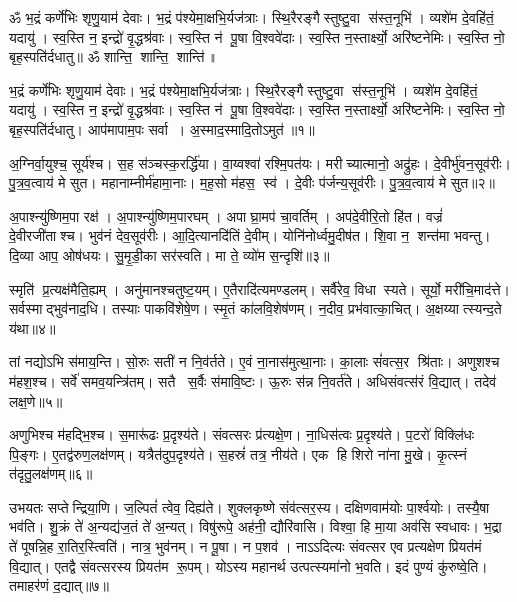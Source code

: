 \setcounter{anuvakam}{0}
ॐ भ॒द्रं कर्णे॑भिः शृणु॒याम॑ देवाः। भ॒द्रं प॑श्येमा॒क्षभि॒र्यज॑त्राः। 
स्थि॒रैरङ्गैस्तुष्टु॒वा स॑स्त॒नूभि॑। व्यशे॑म दे॒वहि॑तं॒ यदायु॑। 
स्व॒स्ति न॒ इन्द्रो॑ वृ॒द्धश्र॑वाः। स्व॒स्ति न॑ पू॒षा वि॒श्ववे॑दाः। 
स्व॒स्ति न॒स्तार्क्ष्यो॒ अरि॑ष्टनेमिः। स्व॒स्ति नो॒ बृह॒स्पति॑र्दधातु॥
ॐ शान्ति॒ शान्ति॒ शान्ति॑॥

भ॒द्रं कर्णे॑भिः शृणु॒याम॑ देवाः। भ॒द्रं प॑श्येमा॒क्षभि॒र्यज॑त्राः। 
स्थि॒रैरङ्गैस्तुष्टु॒वा स॑स्त॒नूभि॑। व्यशे॑म दे॒वहि॑तं॒ यदायु॑। 
स्व॒स्ति न॒ इन्द्रो॑ वृ॒द्धश्र॑वाः। स्व॒स्ति न॑ पू॒षा वि॒श्ववे॑दाः। 
स्व॒स्ति न॒स्तार्क्ष्यो॒ अरि॑ष्टनेमिः। स्व॒स्ति नो॒ बृह॒स्पति॑र्दधातु। 
आप॑मापाम॒पः सर्वा। अ॒स्माद॒स्मादि॒तोऽमुत॑॥१॥ 

अ॒ग्निर्वा॒युश्च॒ सूर्य॑श्च। स॒ह स॑ञ्चस्क॒रर्द्धि॑या। 
वा॒य्वश्वा॑ रश्मि॒पत॑यः। मरीच्यात्मानो॒ अद्रु॑हः। 
दे॒वीर्भु॑वन॒सूव॑रीः। पु॒त्र॒व॒त्वाय॑ मे सुत। 
महानाम्नीर्म॑हामा॒नाः। म॒ह॒सो म॑हस॒ स्व॑। 
दे॒वीः प॑र्जन्य॒सूव॑रीः। पु॒त्र॒व॒त्वाय॑ मे सुत॥२॥

अ॒पाश्न्यु॑ष्णिम॒पा रक्ष॑। अ॒पाश्न्यु॑ष्णिम॒पारघम्। 
अपाघ्रा॒मप॑ चा॒वर्तिम्। अप॑दे॒वीरि॒तो हि॑त। 
वज्रं॑ दे॒वीरजी॑ताश्च। भुव॑नं देव॒सूव॑रीः। 
आ॒दि॒त्यानदि॑तिं दे॒वीम्। योनि॑नोर्ध्वमु॒दीष॑त। 
शि॒वा न॒ शन्त॑मा भवन्तु। दि॒व्या आप॒ ओष॑धयः। 
सु॒मृ॒डी॒का सर॑स्वति। मा ते॒ व्यो॑म स॒न्दृशि॑॥३॥\anuvakamend


स्मृति॑ प्र॒त्यक्ष॑मैति॒ह्यम्। अनु॑मानश्चतुष्ट॒यम्‌। 
ए॒तैरादि॑त्य\-मण्डलम्‌। सर्वै॑रेव॒ विधास्यते। 
सूर्यो॒ मरी॑चि॒माद॑त्ते। सर्वस्माद्भुव॑नाद॒धि। 
तस्याः पाकवि॑शेषे॒ण। स्मृ॒तं का॑लवि॒शेष॑णम्‌। 
न॒दीव॒ प्रभ॑वात्का॒चित्‌। अ॒क्षय्यात्स्यन्द॒ते य॑था॥४॥

तां नद्योऽभि स॑माय॒न्ति। सो॒रुः सती॑ न नि॒व॑र्तते। 
ए॒वं ना॒नास॑मुत्था॒नाः। का॒लाः सं॑वत्स॒र श्रि॑ताः। 
 अणुशश्च म॑हश॒श्च। सर्वे॑ समव॒यन्त्रि॑तम्‌। 
सतै स॒र्वैः स॑मावि॒ष्टः। ऊ॒रुः स॑न्न नि॒वर्त॑ते। 
अधिसंवत्स॑रं वि॒द्यात्‌। तदेव॑ लक्ष॒णे॥५॥

अणुभिश्च म॑हद्भि॒श्च। स॒मारू॑ढः प्र॒दृश्य॑ते। 
संवत्सरः प्र॑त्यक्षे॒ण। ना॒धिस॑त्वः प्र॒दृश्य॑ते। 
प॒टरो॑ विक्लि॑धः पि॒ङ्गः। ए॒तद्व॑रुण॒लक्ष॑णम्‌। 
यत्रैत॑दुप॒दृश्य॑ते। स॒हस्रं॑ तत्र॒ नीय॑ते। 
एक हि शिरो ना॑ना मु॒खे। कृ॒त्स्नं त॑दृतु॒लक्ष॑णम्‌॥६॥

उभयतः सप्तेन्द्रिया॒णि। ज॒ल्पितं॑ त्वेव॒ दिह्य॑ते। 
शुक्लकृष्णे संव॑त्सर॒स्य। दक्षिणवाम॑योः पा॒र्श्वयोः। 
तस्यै॒षा भव॑ति। शु॒क्रं ते॑ अ॒न्यद्य॑ज॒तं ते॑ अ॒न्यत्‌। 
विषु॑रूपे॒ अह॑नी॒ द्यौरि॑वासि। विश्वा॒ हि मा॒या अव॑सि स्वधावः। 
भ॒द्रा ते॑ पूषन्नि॒ह रा॒तिर॒स्त्विति॑। नात्र॒ भुव॑नम्‌। न पू॒षा। 
न प॒शव॑। नाऽऽदित्यः संवत्सर एव प्रत्यक्षेण प्रियत॑मं वि॒द्यात्‌। 
एतद्वै संवत्सरस्य प्रियत॑म रू॒पम्‌। योऽस्य महानर्थ उत्पत्स्यमा॑नो भ॒वति। 
इदं पुण्यं कु॑रुष्वे॒ति। तमाहर॑णं द॒द्यात्‌॥७॥\anuvakamend


